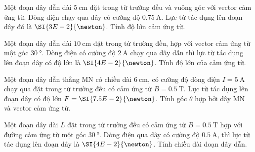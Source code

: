 \begin{ex}
	Một đoạn dây dẫn dài $\SI{5}{\centi\meter}$ đặt trong từ trường đều và vuông góc với vector cảm ứng từ. Dòng điện chạy qua dây có cường độ $\SI{0.75}{\ampere}$. Lực từ tác dụng lên đoạn dây đó là $\SI{3E-2}{\newton}$. Tính độ lớn cảm ứng từ.
\end{ex}
\begin{ex}
	Một đoạn dây dẫn dài $\SI{10}{\centi\meter}$ đặt trong từ trường đều, hợp với vector cảm ứng từ một góc $\SI{30}{\degree}$. Dòng điện có cường độ $\SI{2}{\ampere}$ chạy qua dây dẫn thì lực từ tác dụng lên đoạn dây có độ lớn là $\SI{4E-2}{\newton}$. Tính độ lớn của cảm ứng từ.
\end{ex}
\begin{ex}
Một đoạn dây dẫn thẳng MN có chiều dài $\SI{6}{\centi\meter}$, có cường độ dòng điện $I=\SI{5}{\ampere}$ chạy qua đặt trong từ trường đều có cảm ứng từ $B=\SI{0.5}{\tesla}$. Lực từ tác dụng lên đoạn dây có độ lớn $F=\SI{7.5E-2}{\newton}$. Tính góc $\theta$ hợp bởi dây MN và vector cảm ứng từ.	
\end{ex}
\begin{ex}
Một đoạn dây dài $L$ đặt trong từ trường đều có cảm ứng từ $B=\SI{0.5}{\tesla}$ hợp với đường cảm ứng từ một góc $\SI{30}{\degree}$. Dòng điện qua dây có cường độ $\SI{0.5}{\ampere}$, thì lực từ tác dụng lên đoạn dây là $\SI{4E-2}{\newton}$. Tính chiều dài đoạn dây dẫn.	
\end{ex}
